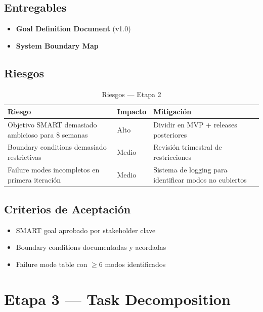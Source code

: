\documentclass[12pt,a4paper]{article}
\begin{document}
\subsection*{Entregables}
\begin{itemize}
  \item \textbf{Goal Definition Document} (v1.0)
  \item \textbf{System Boundary Map}
\end{itemize}

\subsection*{Riesgos}
\begin{table}[h]
\centering
\begin{tabular}{p{} p{} p{}}
\toprule
\textbf{Riesgo} & \textbf{Impacto} & \textbf{Mitigación} \\
\midrule
Objetivo SMART demasiado ambicioso para 8 semanas            & Alto  & Dividir en MVP + releases posteriores \\
Boundary conditions demasiado restrictivas                    & Medio & Revisión trimestral de restricciones \\
Failure modes incompletos en primera iteración                & Medio & Sistema de logging para identificar modos no cubiertos \\
\bottomrule
\end{tabular}
\caption{Riesgos --- Etapa 2}
\end{table}

\subsection*{Criterios de Aceptación}
\begin{itemize}
  \item[{${[\;]}$}] SMART goal aprobado por stakeholder clave
  \item[{${[\;]}$}] Boundary conditions documentadas y acordadas
  \item[{${[\;]}$}] Failure mode table con $\geq$6 modos identificados
\end{itemize}

\section{Etapa 3 --- Task Decomposition}
\end{document}
